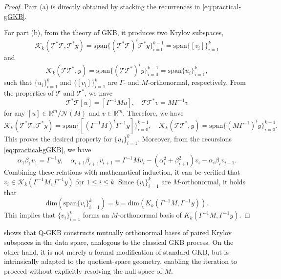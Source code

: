 \documentclass[]{myarticle}
\begin{document}
\begin{proof}
Part (a) is directly obtained by stacking the recurrences in \cref{eq:practical-gGKB}. 

For part (b), from the theory of GKB, it produces two Krylov subspaces,
\begin{equation*}\label{Krylov_v}
  \mathcal K_{k}(\mathcal{T}^*\mathcal{T}, \mathcal{T}^*y) 
  = \mathrm{span}\{(\mathcal{T}^*\mathcal{T})^{i}\mathcal{T}^*y\}_{i=0}^{k-1}
  = \mathrm{span}\{[v_i]\}_{i=1}^{k} 
\end{equation*}
and 
\begin{equation*}
  \mathcal K_{k}(\mathcal{T}\mathcal{T}^*, y) 
  = \mathrm{span}\{(\mathcal{T}\mathcal{T}^*)^{i}y\}_{i=0}^{k-1}
  =  \mathrm{span}\{u_i\}_{i=1}^{k},
\end{equation*}
such that $\{u_i\}_{i=1}^{k}$ and $\{[v_i]\}_{i=1}^{k}$ are $\Gamma$- and $M$-orthonormal, respectively. From the properties of $\mathcal{T}$ and $\mathcal{T}^*$, we have 
\begin{equation*}
  \mathcal{T}^*\mathcal{T}[u] = [\Gamma^{-1}Mu], \quad
  \mathcal{T}\mathcal{T}^{*}v = M\Gamma^{-1}v
\end{equation*}
for any $[u]\in \mathbb{R}^m/\mathcal{N}(M)$ and $v\in\mathbb{R}^{m}$. Therefore, we have 
\begin{equation*}
  \mathcal K_{k}(\mathcal{T}^*\mathcal{T}, \mathcal{T}^*y) = \mathrm{span}\{[(\Gamma^{-1}M)^i\Gamma^{-1}y]\}_{i=0}^{k-1}, \quad
  \mathcal K_{k}(\mathcal{T}\mathcal{T}^*, y) = \mathrm{span}\{(M\Gamma^{-1})^iy\}_{i=0}^{k-1} .
\end{equation*}
This proves the desired property for $\{u_i\}_{i=1}^{k}$. Moreover, from the recursions \cref{eq:practical-gGKB}, we have  
\begin{equation*}
  \alpha_1\beta_1 v_1 = \Gamma^{-1}y, \quad
  \alpha_{i+1}\beta_{i+1}v_{i+1} = \Gamma^{-1}Mv_{i} - (\alpha_{i}^2+\beta_{i+1}^2)v_i - \alpha_{i}\beta_{i}v_{i-1}.
\end{equation*}
Combining these relations with mathematical induction, it can be verified that $v_i\in \mathcal K_k(\Gamma^{-1}M,\Gamma^{-1}y)$ for $1\leq i\leq k$. Since $\{v_i\}_{i=1}^{k}$ are $M$-orthonormal, it holds that 
\[\mathrm{dim}\left(\mathrm{span}\{v_i\}_{i=1}^{k}\right)=k=\mathrm{dim}\left(K_k(\Gamma^{-1}M,\Gamma^{-1}y)\right).\]
This implies that $\{v_i\}_{i=1}^k$ forms an $M$-orthonormal basis of $K_k(\Gamma^{-1}M,\Gamma^{-1}y)$.
\end{proof}

 shows that Q-GKB constructs mutually orthonormal bases of paired Krylov subspaces in the data space, analogous to the classical GKB process. On the other hand, it is not merely a formal modification of standard GKB, but is intrinsically adapted to the quotient-space geometry, enabling the iteration to proceed without explicitly resolving the null space of $M$.
\end{document}
